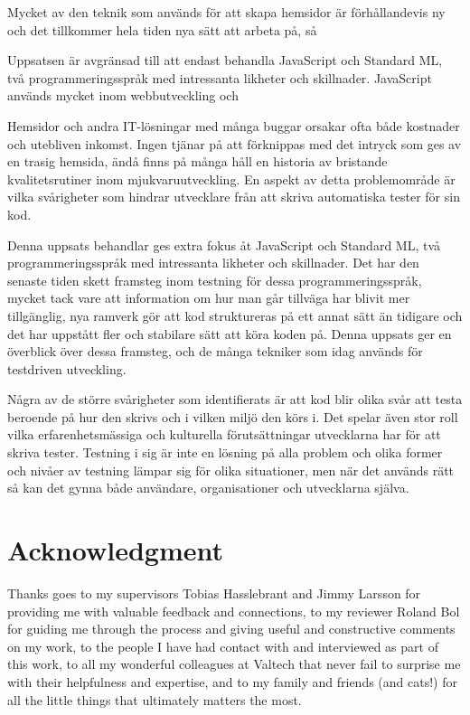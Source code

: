 Mycket av den teknik som används för att skapa hemsidor är förhållandevis ny och det tillkommer hela tiden nya sätt att arbeta på, så

Uppsatsen är avgränsad till att endast behandla JavaScript och Standard ML, två programmeringsspråk med intressanta likheter och skillnader. JavaScript används mycket inom webbutveckling och

Hemsidor och andra IT-lösningar med många buggar orsakar ofta både kostnader och utebliven inkomst. Ingen tjänar på att förknippas med det intryck som ges av en trasig hemsida, ändå finns på många håll en historia av bristande kvalitetsrutiner inom mjukvaruutveckling. En aspekt av detta problemområde är vilka svårigheter som hindrar utvecklare från att skriva automatiska tester för sin kod.

Denna uppsats behandlar ges extra fokus åt JavaScript och Standard ML, två programmeringsspråk med intressanta likheter och skillnader. Det har den senaste tiden skett framsteg inom testning för dessa programmeringsspråk, mycket tack vare att information om hur man går tillväga har blivit mer tillgänglig, nya ramverk gör att kod struktureras på ett annat sätt än tidigare och det har uppstått fler och stabilare sätt att köra koden på. Denna uppsats ger en överblick över dessa framsteg, och de många tekniker som idag används för testdriven utveckling.

Några av de större svårigheter som identifierats är att kod blir olika svår att testa beroende på hur den skrivs och i vilken miljö den körs i. Det spelar även stor roll vilka erfarenhetsmässiga och kulturella förutsättningar utvecklarna har för att skriva tester. Testning i sig är inte en lösning på alla problem och olika former och nivåer av testning lämpar sig för olika situationer, men när det används rätt så kan det gynna både användare, organisationer och utvecklarna själva.

\newpage
\null
\newpage

\section*{Acknowledgment}

Thanks goes to my supervisors Tobias Hasslebrant and Jimmy Larsson for providing me with valuable feedback and connections, to my reviewer Roland Bol for guiding me through the process and giving useful and constructive comments on my work, to the people I have had contact with and interviewed as part of this work, to all my wonderful colleagues at Valtech that never fail to surprise me with their helpfulness and expertise, and to my family and friends (and cats!) for all the little things that ultimately matters the most.

\newpage
\null
\newpage

\tableofcontents

\newpage
\null
\newpage

